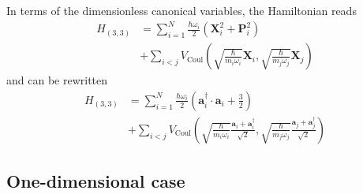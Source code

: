 \documentclass[reprint, amsmath, amssymb, aps]{revtex4-2}
\begin{document}
        In terms of the dimensionless canonical variables, the Hamiltonian reads
        \begin{equation}
        \begin{split}
            H_{(3,3)} &= \sum_{i=1}^N\frac{\hbar\omega_i}{2}\left(\bm X_{i}^2 + \bm P_{i}^2\right) \\
            & + \sum_{i<j}V_\text{Coul}\left(\sqrt{\frac{\hbar}{m_i\omega_i}}\bm{X} _i, \sqrt{\frac{\hbar}{m_j\omega_j}}\bm{X} _j\right)
        \end{split}
        \end{equation}
        and can be rewritten
        \begin{equation}
        \begin{split}
            H_{(3,3)} &= \sum_{i=1}^N\frac{\hbar\omega_i}{2}\left(\bm a_{i}^\dagger\cdot\bm a_{i} +\frac{3}{2}\right) \\
            & + \sum_{i<j}V_\text{Coul}\left(\sqrt{\frac{\hbar}{m_i\omega_i}}\frac{\bm a_i + \bm a_i^\dagger}{\sqrt 2}, \sqrt{\frac{\hbar}{m_j\omega_j}}\frac{\bm a_j + \bm a_j^\dagger}{\sqrt 2}\right)
        \end{split}
        \end{equation}
    \subsection{One-dimensional case}
\end{document}
